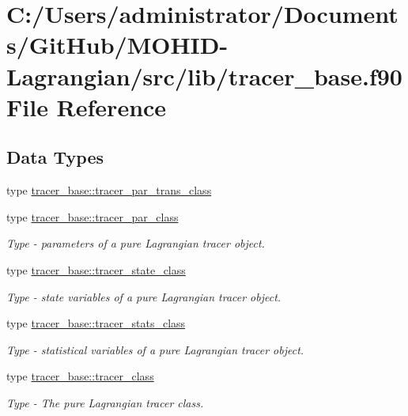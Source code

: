 \hypertarget{tracer__base_8f90}{}\section{C\+:/\+Users/administrator/\+Documents/\+Git\+Hub/\+M\+O\+H\+I\+D-\/\+Lagrangian/src/lib/tracer\+\_\+base.f90 File Reference}
\label{tracer__base_8f90}
\subsection*{Data Types}
\begin{DoxyCompactItemize}
\item 
type \mbox{\hyperlink{structtracer__base_1_1tracer__par__trans__class}{tracer\+\_\+base\+::tracer\+\_\+par\+\_\+trans\+\_\+class}}
\item 
type \mbox{\hyperlink{structtracer__base_1_1tracer__par__class}{tracer\+\_\+base\+::tracer\+\_\+par\+\_\+class}}
\begin{DoxyCompactList}\small\item\em Type -\/ parameters of a pure Lagrangian tracer object. \end{DoxyCompactList}\item 
type \mbox{\hyperlink{structtracer__base_1_1tracer__state__class}{tracer\+\_\+base\+::tracer\+\_\+state\+\_\+class}}
\begin{DoxyCompactList}\small\item\em Type -\/ state variables of a pure Lagrangian tracer object. \end{DoxyCompactList}\item 
type \mbox{\hyperlink{structtracer__base_1_1tracer__stats__class}{tracer\+\_\+base\+::tracer\+\_\+stats\+\_\+class}}
\begin{DoxyCompactList}\small\item\em Type -\/ statistical variables of a pure Lagrangian tracer object. \end{DoxyCompactList}\item 
type \mbox{\hyperlink{structtracer__base_1_1tracer__class}{tracer\+\_\+base\+::tracer\+\_\+class}}
\begin{DoxyCompactList}\small\item\em Type -\/ The pure Lagrangian tracer class. \end{DoxyCompactList}\end{DoxyCompactItemize}
